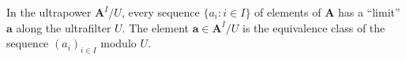 In the ultrapower $\mathbf{A}^I / U$, every sequence $\{a_i : i \in I\}$ of elements of $\mathbf{A}$ has a ``limit'' $\mathbf{a}$ along the ultrafilter $U$. The element $\mathbf{a} \in \mathbf{A}^I / U$ is the equivalence class of the sequence $(a_i)_{i \in I}$ modulo $U$.
